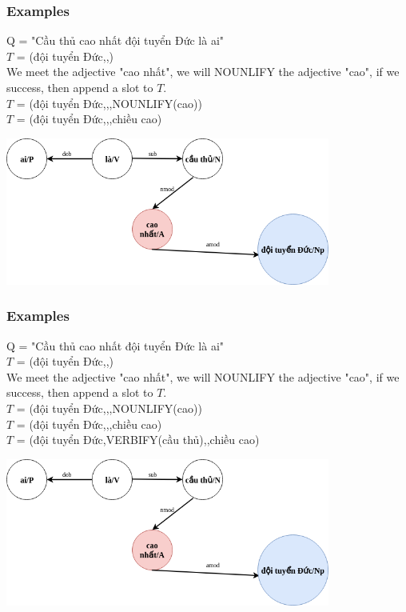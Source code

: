 \documentclass{beamer}
\begin{document}
\begin{frame}
	\frametitle{Examples}
	
	Q = "Cầu thủ cao nhất đội tuyển Đức là ai"\\
	$T$ = (đội tuyển Đức,,)\\
	
	We meet the adjective "cao nhất", we will NOUNLIFY the adjective "cao", if we success, then append a slot to $T$.\\
	$T$ = (đội tuyển Đức,,,NOUNLIFY(cao))\\
	$T$ = (đội tuyển Đức,,,chiều cao)\\
	
	
	\begin{center} 
		\centering 
			\includegraphics[width=0.8\textwidth,height=0.8\textheight,keepaspectratio]{thirdextree2}
			\vspace{0.5cm} 
	\end{center}
		
\end{frame}

\begin{frame}
	\frametitle{Examples}
	
	Q = "Cầu thủ cao nhất đội tuyển Đức là ai"\\
	$T$ = (đội tuyển Đức,,)\\
	
	We meet the adjective "cao nhất", we will NOUNLIFY the adjective "cao", if we success, then append a slot to $T$.\\
	$T$ = (đội tuyển Đức,,,NOUNLIFY(cao))\\
	$T$ = (đội tuyển Đức,,,chiều cao)\\
	$T$ = (đội tuyển Đức,VERBIFY(cầu thủ),,chiều cao)\\
	
	
	\begin{center} 
		\centering 
			\includegraphics[width=0.8\textwidth,height=0.8\textheight,keepaspectratio]{thirdextree2}
			\vspace{0.5cm} 
	\end{center}
		
\end{frame}
\end{document}
